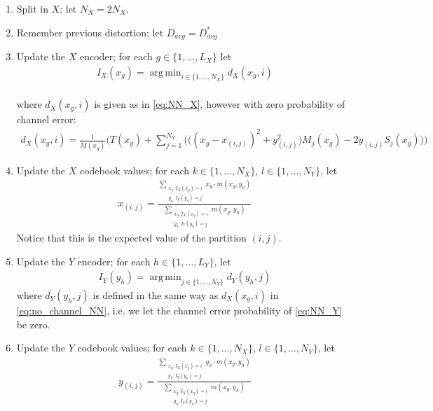 \documentclass[10pt]{article}
\DeclareMathOperator*{\argmin}{arg\,min}
\begin{document}
\begin{enumerate}
    
    \item \label{init_split} Split in $X$: let $N_X=2N_X$.
    \item \label{init_start} Remember previous distortion; let $D_{avg}=D^*_{avg}$
    \item Update the $X$ encoder; for each $g\in\{1,\ldots,L_X\}$ let
    \begin{align}
        I_X(x_g) = \argmin_{i \in \{1,\dots,N_X\}}d_X(x_g,i)
    \end{align}
    \\
    where $d_X(x_g,i)$ is given as in \eqref{eq:NN_X}, however with zero probability of channel error:
    \begin{align}
        \label{eq:no_channel_NN}
        d_X(x_g,i) =
            \frac{1}{M(x_g)} \bigg(T(x_g) + 
            \sum_{j=1}^{N_Y}
            \Big(\big({(x_g-x_{(i,j)})}^2 +
            y_{(i,j)}^2\big)M_j(x_g) -2y_{(i,j)}S_j(x_g)\Big)\bigg)
    \end{align}
    \item Update the $X$ codebook values; for each $k\in \{1,\ldots,N_X\}$, $l\in\{1,\ldots,N_Y\}$, let
    \begin{align}
        x_{(i,j)} = 
            \frac{\sum_{\substack{x_g:I_X(x_g)=i\\y_h:I_Y(y_h)=j}}x_g\cdot m(x_g,y_h)}
            {\sum_{\substack{x_g:I_X(x_g)=i\\y_h:I_Y(y_h)=j}}m(x_g,y_h)}
    \end{align}
    Notice that this is the expected value of the partition $(i,j)$.
    \item Update the $Y$ encoder; for each $h\in \{1,\ldots,L_Y\}$, let
    \begin{align}
        I_Y(y_h) = \argmin_{j\in\{1,\ldots,N_Y\}}d_Y(y_h,j)
    \end{align}
    where $d_Y(y_h,j)$ is defined in the same way as $d_X(x_g,i)$ in \eqref{eq:no_channel_NN}, i.e. we let the channel error probability of \eqref{eq:NN_Y} be zero.
    \item Update the $Y$ codebook values; for each $k\in \{1,\ldots,N_X\}$, $l\in\{1,\ldots,N_Y\}$, let
    \begin{align}
        y_{(i,j)} = 
            \frac{\sum_{\substack{x_g:I_X(x_g)=i\\y_h:I_Y(y_h)=j}}y_h\cdot m(x_g,y_h)}
            {\sum_{\substack{x_g:I_X(x_g)=i\\y_h:I_Y(y_h)=j}}m(x_g,y_h)}

\end{align}
\end{enumerate}
\end{document}
